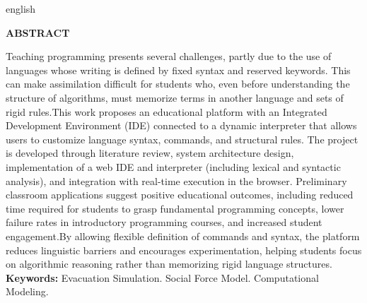 \documentclass[
        oneside,      %
        english,			
        brazil			 
        ]{configcefetmglpd}
\begin{document}
 
\begin{abstract_cefetmg}
 \begin{otherlanguage*}{english}


\begin{center}
    \textbf{ABSTRACT} 
\end{center} 

Teaching programming presents several challenges, partly due to the use of languages whose writing is defined by fixed syntax and reserved keywords. This can make assimilation difficult for students who, even before understanding the structure of algorithms, must memorize terms in another language and sets of rigid rules.This work proposes an educational platform with an Integrated Development Environment (IDE) connected to a dynamic interpreter that allows users to customize language syntax, commands, and structural rules. The project is developed through literature review, system architecture design, implementation of a web IDE and interpreter (including lexical and syntactic analysis), and integration with real-time execution in the browser. Preliminary classroom applications suggest positive educational outcomes, including reduced time required for students to grasp fundamental programming concepts, lower failure rates in introductory programming courses, and increased student engagement.By allowing flexible definition of commands and syntax, the platform reduces linguistic barriers and encourages experimentation, helping students focus on algorithmic reasoning rather than memorizing rigid language structures.
\noindent
\textbf{Keywords:} Evacuation Simulation. Social Force Model. Computational Modeling.%

  \end{otherlanguage*}
\end{abstract_cefetmg}





\figvariadas   %
\listfigvariadas  %
\end{document}
